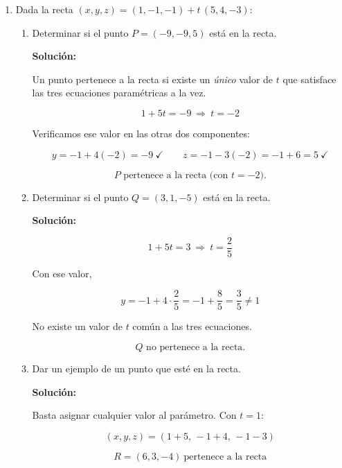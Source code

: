 \documentclass[12pt]{article}
\newcommand{\solucion}{%
    \vspace{0.8em}%
    \textbf{Solución:}%
    \vspace{0.8em}%
}
\begin{document}
\begin{enumerate}[label=\alph*.-]
\begin{enumerate}[label=\roman*)]
        \textbf{Simétricas:}
        \[
        \boxed{\frac{x-1}{-1}=\frac{y-5}{1}=\frac{z+1}{-1}}
        \]

    \end{enumerate}

    \item Dada la recta $(x,y,z)=(1,-1,-1)+t\,(5,4,-3)$:

    \begin{enumerate}[label=\roman*)]

        \item Determinar si el punto $P=(-9,-9,5)$ está en la recta.

        \solucion

        Un punto pertenece a la recta si existe un \emph{único} valor de $t$
        que satisface las tres ecuaciones paramétricas a la vez.

        \[
        1+5t=-9\ \Longrightarrow\ t=-2
        \]

        Verificamos ese valor en las otras dos componentes:

        \[
        y=-1+4(-2)=-9\ \checkmark \qquad
        z=-1-3(-2)=-1+6=5\ \checkmark
        \]

        \[
        \boxed{P \text{ pertenece a la recta (con } t=-2\text{).}}
        \]

        \item Determinar si el punto $Q=(3,1,-5)$ está en la recta.

        \solucion

        \[
        1+5t=3\ \Longrightarrow\ t=\frac{2}{5}
        \]

        Con ese valor,

        \[
        y=-1+4\cdot\frac{2}{5}=-1+\frac{8}{5}=\frac{3}{5}\neq1
        \]

        No existe un valor de $t$ común a las tres ecuaciones.

        \[
        \boxed{Q \text{ no pertenece a la recta.}}
        \]

        \item Dar un ejemplo de un punto que esté en la recta.

        \solucion

        Basta asignar cualquier valor al parámetro. Con $t=1$:

        \[
        (x,y,z)=(1+5,\,-1+4,\,-1-3)
        \]

        \[
        \boxed{R=(6,3,-4)\ \text{pertenece a la recta}}
        \]


\end{enumerate}
\end{enumerate}
\end{document}
